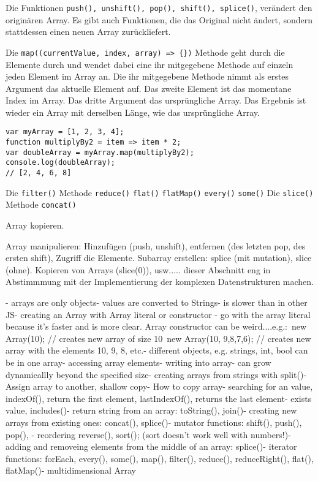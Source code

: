 \documentclass{book}
\begin{document}
Die Funktionen \lstinline|push(), unshift(), pop(), shift(), splice()|, verändert den originären Array. Es gibt auch Funktionen, die das Original nicht ändert, sondern stattdessen einen neuen Array zurückliefert.

Die \lstinline|map((currentValue, index, array) => {})| Methode geht durch die Elemente durch und wendet dabei eine ihr mitgegebene Methode auf einzeln jeden Element im Array an. Die ihr mitgegebene Methode nimmt als erstes Argument das aktuelle Element auf. Das zweite Element ist das momentane Index im Array. Das dritte Argument das ursprüngliche Array. Das Ergebnis ist wieder ein Array mit derselben Länge, wie das ursprüngliche Array.

\begin{lstlisting}[caption=Array Konstruktor]
var myArray = [1, 2, 3, 4];
function multiplyBy2 = item => item * 2;
var doubleArray = myArray.map(multiplyBy2);
console.log(doubleArray);
// [2, 4, 6, 8]
\end{lstlisting}

Die \lstinline|filter()| Methode 
\lstinline|reduce()|
\lstinline|flat()|
\lstinline|flatMap()|
\lstinline|every()|
\lstinline|some()|
Die \lstinline|slice()| Methode 
\lstinline|concat()|

Array kopieren. 

Array manipulieren: Hinzufügen (push, unshift), entfernen (des letzten pop, des ersten shift), Zugriff die Elemente. Subarray erstellen: splice (mit mutation), slice (ohne). Kopieren von Arrays (slice(0)), usw..... dieser Abschnitt eng in Abstimmmung mit der Implementierung der komplexen Datenstrukturen machen.

- arrays are only objects- values are converted to Strings- is slower than in other JS- creating an Array with Array literal or constructor - go with the array literal because it's faster and is more clear. Array constructor can be weird....e.g.: new Array(10); // creates new array of size 10 new Array(10, 9,8,7,6); // creates new array with the elements 10, 9, 8, etc.- different objects, e.g. strings, int, bool can be in one array- accessing array elements- writing into array- can grow dynamicallly beyond the specified size- creating arrays from strings with split()- Assign array to another, shallow copy- How to copy array- searching for an value, indexOf(), return the first element, lastIndexOf(), returns the last element- exists value, includes()- return string from an array: toString(), join()- creating new arrays from existing ones: concat(), splice()- mutator functions: shift(), push(), pop(), - reordering reverse(), sort(); (sort doesn't work well with numbers!)- adding and removeing elements from the middle of an array: splice()- iterator functions: forEach, every(), some(), map(), filter(), reduce(), reduceRight(), flat(), flatMap()- multidimensional Array
\end{document}
